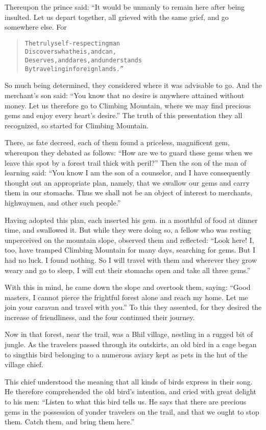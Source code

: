\documentclass[article, twoside, 14pt]{memoir}
\renewenvironment{verbatim}{%
\begin{quote}%
\vskip -10pt%
\begin{alltt}\normalfont\large}{\end{alltt}%
\end{quote}%
\vskip -10pt
} %
\begin{document}
Thereupon the prince said: “It would be unmanly to remain here
after being insulted. Let us depart together, all grieved with the
same grief, and go somewhere else. For

\begin{verbatim}
The truly self-respecting man
Discovers what he is, and can,
Deserves, and dares, and understands
By traveling in foreign lands.”
\end{verbatim}
So much being determined, they considered where it was advisable to
go. And the merchant's son said:
``You know that no desire is anywhere attained without money. Let us therefore go to Climbing Mountain, where we may find precious gems and enjoy every heart's desire.''
The truth of this presentation they all recognized, so started for
Climbing Mountain.

There, as fate decreed, each of them found a priceless, magnificent
gem, whereupon they debated as follows:
``How are we to guard these gems when we leave this spot by a forest trail thick with peril?''
Then the son of the man of learning said:
``You know I am the son of a counselor, and I have consequently thought out an appropriate plan, namely, that we swallow our gems and carry them in our stomachs. Thus we shall not be an object of interest to merchants, highwaymen, and other such people.''

Having adopted this plan, each inserted his gem. in a mouthful of
food at dinner time, and swallowed it. But while they were doing
so, a fellow who was resting unperceived on the mountain slope,
observed them and reflected:
``Look here! I, too, have tramped Climbing Mountain for many days, searching for gems. But I had no luck. I found nothing. So I will travel with them and wherever they grow weary and go to sleep, I will cut their stomachs open and take all three gems.''

With this in mind, he came down the slope and overtook them,
saying:
``Good masters, I cannot pierce the frightful forest alone and reach my home. Let me join your caravan and travel with you.''
To this they assented, for they desired the increase of
friendliness, and the four continued their journey.

Now in that forest, near the trail, was a Bhil village, nestling in
a rugged bit of jungle. As the travelers passed through its
outskirts, an old bird in a cage began to sing{\textemdash}this bird
belonging to a numerous aviary kept as pets in the hut of the
village chief.

This chief understood the meaning that all kinds of birds express
in their song. He therefore comprehended the old bird's intention,
and cried with great delight to his men:
``Listen to what this bird tells us. He says that there are precious gems in the possession of yonder travelers on the trail, and that we ought to stop them. Catch them, and bring them here.''
\end{document}
